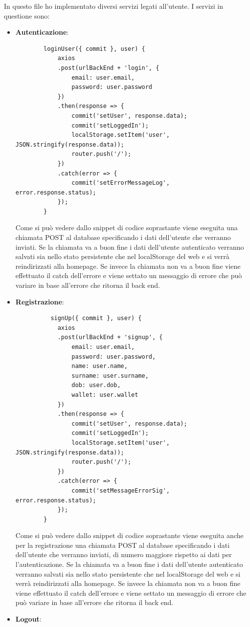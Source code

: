 In questo file ho implementato diversi servizi legati all'utente. I servizi in questione sono:
\begin{itemize}
	\item \textbf{Autenticazione}:
	\begin{lstlisting}
		loginUser({ commit }, user) {
			axios
			.post(urlBackEnd + 'login', {
				email: user.email,
				password: user.password
			})
			.then(response => {
				commit('setUser', response.data);
				commit('setLoggedIn');
				localStorage.setItem('user', JSON.stringify(response.data));
				router.push('/');
			})
			.catch(error => {
				commit('setErrorMessageLog', error.response.status);
			});
		}
	\end{lstlisting}
	Come si può vedere dallo snippet di codice soprastante viene eseguita una chiamata POST al database specificando i dati dell'utente che verranno inviati. Se la chiamata va a buon fine i dati dell'utente autenticato verranno salvati sia nello stato persistente che nel localStorage del web e si verrà reindirizzati alla homepage. Se invece la chiamata non va a buon fine viene effettuato il catch dell'errore e viene settato un messaggio di errore che può variare in base all'errore che ritorna il back end.
	\item \textbf{Registrazione}:
	\begin{lstlisting}
		  signUp({ commit }, user) {
			axios
			.post(urlBackEnd + 'signup', {
				email: user.email,
				password: user.password,
				name: user.name,
				surname: user.surname,
				dob: user.dob,
				wallet: user.wallet
			})
			.then(response => {
				commit('setUser', response.data);
				commit('setLoggedIn');
				localStorage.setItem('user', JSON.stringify(response.data));
				router.push('/');
			})
			.catch(error => {
				commit('setMessageErrorSig', error.response.status);
			});
		}
	\end{lstlisting}
	Come si può vedere dallo snippet di codice soprastante viene eseguita anche per la registrazione una chiamata POST al database specificando i dati dell'utente che verranno inviati, di numero maggiore rispetto ai dati per l'autenticazione. Se la chiamata va a buon fine i dati dell'utente autenticato verranno salvati sia nello stato persistente che nel localStorage del web e si verrà reindirizzati alla homepage. Se invece la chiamata non va a buon fine viene effettuato il catch dell'errore e viene settato un messaggio di errore che può variare in base all'errore che ritorna il back end.
	\item \textbf{Logout}:
	\begin{lstlisting}

\end{lstlisting}
\end{itemize}

